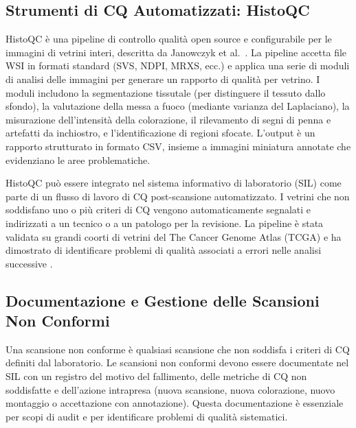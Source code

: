 \subsection{Strumenti di CQ Automatizzati: HistoQC}

HistoQC è una pipeline di controllo qualità open source e configurabile per le immagini di
vetrini interi, descritta da Janowczyk et al.\ \cite{janowczyk2019}. La pipeline accetta file WSI
in formati standard (SVS, NDPI, MRXS, ecc.) e applica una serie di moduli di analisi delle
immagini per generare un rapporto di qualità per vetrino. I moduli includono la segmentazione
tissutale (per distinguere il tessuto dallo sfondo), la valutazione della messa a fuoco (mediante
varianza del Laplaciano), la misurazione dell'intensità della colorazione, il rilevamento di
segni di penna e artefatti da inchiostro, e l'identificazione di regioni sfocate. L'output è un
rapporto strutturato in formato CSV, insieme a immagini miniatura annotate che evidenziano le
aree problematiche.

HistoQC può essere integrato nel sistema informativo di laboratorio (SIL) come parte di un flusso
di lavoro di CQ post-scansione automatizzato. I vetrini che non soddisfano uno o più criteri di
CQ vengono automaticamente segnalati e indirizzati a un tecnico o a un patologo per la revisione.
La pipeline è stata validata su grandi coorti di vetrini del The Cancer Genome Atlas (TCGA) e ha
dimostrato di identificare problemi di qualità associati a errori nelle analisi successive
\cite{janowczyk2019}.

\subsection{Documentazione e Gestione delle Scansioni Non Conformi}

Una scansione non conforme è qualsiasi scansione che non soddisfa i criteri di CQ definiti dal
laboratorio. Le scansioni non conformi devono essere documentate nel SIL con un registro del
motivo del fallimento, delle metriche di CQ non soddisfatte e dell'azione intrapresa (nuova
scansione, nuova colorazione, nuovo montaggio o accettazione con annotazione). Questa
documentazione è essenziale per scopi di audit e per identificare problemi di qualità sistematici.

